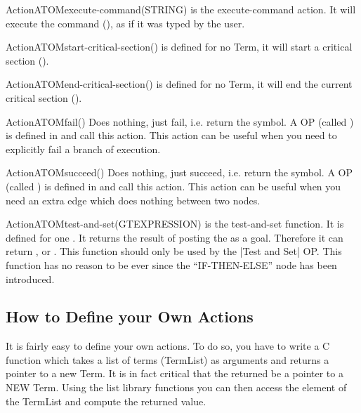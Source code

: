 \begin{typeefa}{Action}{ATOM}{execute-command}{(STRING)} 
is the execute-command action. It will execute the command (), as if it was typed by the user.
\end{typeefa}

\begin{typeefa}{Action}{ATOM}{start-critical-section}{()}
is defined for no Term, it will start a critical section (). 
\end{typeefa}

\begin{typeefa}{Action}{ATOM}{end-critical-section}{()}
is defined for no Term, it will end the current critical section
(). 
\end{typeefa}

\begin{typeefa}{Action}{ATOM}{fail}{()}
Does nothing, just fail, i.e. return the  symbol. A OP (called
) is defined in  and call this action. This
action can be useful when you need to explicitly fail a branch of execution.
\end{typeefa}

\begin{typeefa}{Action}{ATOM}{succeed}{()}
Does nothing, just succeed, i.e. return the  symbol. A OP (called
) is defined in  and call this action. This
action can be useful when you need an extra edge which does nothing between two nodes.
\end{typeefa}

\begin{typeefa}{Action}{ATOM}{test-and-set}{(GTEXPRESSION)}
is the test-and-set function. It is defined for one . It
returns the result of posting the  as a goal. Therefore it can
return ,  or . This function should only be
used by the |Test and Set| OP. This function has no reason to be ever since the
``IF-THEN-ELSE'' node has been introduced. 
\end{typeefa}

\subsection{How to Define your Own Actions}

It is fairly easy to define your own actions. To do so, you have to write a C
function which takes a list of terms (TermList) as arguments and returns a
pointer to a new Term. It is in fact critical that the  returned be a
pointer to a NEW Term. Using the list library functions you can then access the
element of the TermList and compute the returned value.

